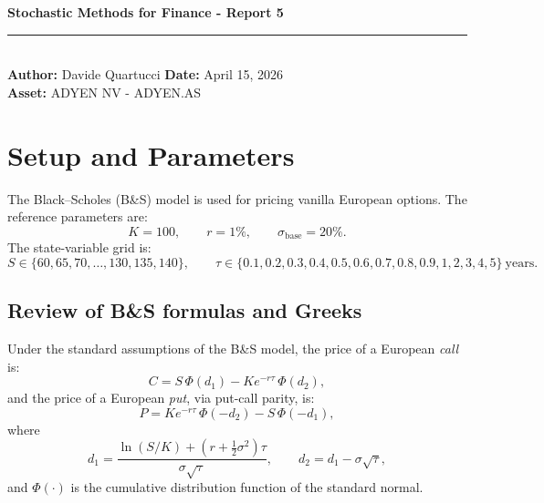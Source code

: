 \documentclass{report}
\begin{document}
\pagestyle{fancy}
\fancyhf{}
\renewcommand{\headrulewidth}{0.4pt}
\setlength{\headheight}{14pt}
\thispagestyle{plain} 

\begin{flushleft}
    {\large \textbf{Stochastic Methods for Finance - Report 5}} \\
    \rule{\textwidth}{0.4pt} \\ 
    \textbf{Author:} Davide Quartucci \hfill \textbf{Date:} April 15, 2026 \\
    \textbf{Asset:} ADYEN NV - ADYEN.AS \\
\end{flushleft}

\begin{center}
\end{center}

\section{Setup and Parameters}
 
The Black--Scholes (B\&S) model is used for pricing vanilla European options.
The reference parameters are:
\[
  K = 100, \qquad r = 1\%, \qquad \sigma_{\mathrm{base}} = 20\%.
\]
The state-variable grid is:
\[
  S \in \{60, 65, 70, \ldots, 130, 135, 140\}, \qquad
      \tau \in \{0.1, 0.2, 0.3, 0.4, 0.5, 0.6, 0.7, 0.8, 0.9, 1, 2, 3, 4, 5\}\ \text{years}.
\]
 
\subsection{Review of B\&S formulas and Greeks}
 
Under the standard assumptions of the B\&S model, the
price of a European \emph{call} is:
\[
  C = S\,\Phi(d_1) - K e^{-r\tau}\,\Phi(d_2),
\]
and the price of a European \emph{put}, via put-call parity, is:
\[
  P = K e^{-r\tau}\,\Phi(-d_2) - S\,\Phi(-d_1),
\]
where
\[
  d_1 = \frac{\ln(S/K) + (r + \tfrac{1}{2}\sigma^2)\tau}{\sigma\sqrt{\tau}},
  \qquad
  d_2 = d_1 - \sigma\sqrt{\tau},
\]
and $\Phi(\cdot)$ is the cumulative distribution function of the standard normal.
 
\end{document}

